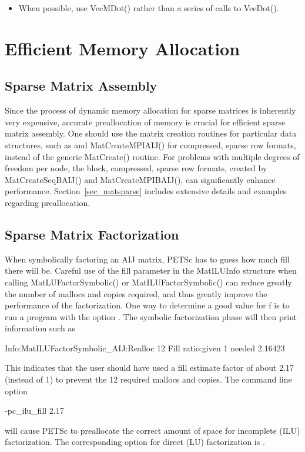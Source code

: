 {{\begin{itemize}
\item When possible, use VecMDot() rather than a series of calls to VecDot().
\end{itemize}

\section{Efficient Memory Allocation}
\label{sec_perf_memory}

\subsection{Sparse Matrix Assembly}

Since the process of dynamic memory allocation for sparse matrices is
inherently very expensive, accurate preallocation of memory is crucial
for efficient sparse matrix assembly.  One should use the matrix creation
routines for particular data structures, such as  and MatCreateMPIAIJ() for compressed, sparse
row formats, instead of the generic MatCreate() routine.  For
problems with multiple degrees of freedom per node, the block,
compressed, sparse row formats, created by MatCreateSeqBAIJ()
and MatCreateMPIBAIJ(), can significantly enhance performance.
Section~\ref{sec_matsparse} includes extensive details and
examples regarding preallocation.

\subsection{Sparse Matrix Factorization}
\label{sec_symbolfactor}

When symbolically factoring an AIJ matrix, PETSc has to guess
how much fill there will be.  Careful use of the fill parameter in the 
MatILUInfo structure  
when calling MatLUFactorSymbolic() or MatILUFactorSymbolic()
can reduce greatly the number of mallocs and copies required, and thus
greatly improve the performance of the factorization.  One way to
determine a good value for f is to run a program with the option .
The symbolic factorization phase will then print information such as
\begin{tabbing}
   Info:MatILUFactorSymbolic\_AIJ:Realloc 12 Fill ratio:given 1 needed 2.16423
\end{tabbing}
This indicates that the user should have used a fill estimate factor of
about 2.17 (instead of 1) to prevent the 12 required mallocs and copies.
The command line option   
\begin{tabbing}
    -pc\_ilu\_fill 2.17
\end{tabbing}
will cause PETSc to preallocate the correct amount of space for incomplete
(ILU) factorization.  The corresponding option for direct (LU) factorization
is  .

}}
